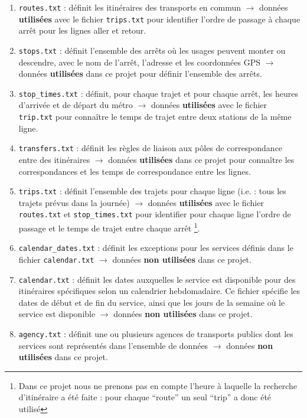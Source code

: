 \documentclass[,french]{article}
\let\rmarkdownfootnote\footnote%
\def\footnote{\protect\rmarkdownfootnote}
\begin{document}
\begin{enumerate}
\def\labelenumi{\arabic{enumi}.}
\item
  \texttt{routes.txt} : définit les itinéraires des transports en commun
  \(\rightarrow\) données \textbf{utilisées} avec le fichier
  \texttt{trips.txt} pour identifier l'ordre de passage à chaque arrêt
  pour les lignes aller et retour.
\item
  \texttt{stops.txt} : définit l'ensemble des arrêts où les usages
  peuvent monter ou descendre, avec le nom de l'arrêt, l'adresse et les
  coordonnées GPS \(\rightarrow\) données \textbf{utilisées} dans ce
  projet pour définir l'ensemble des arrêts.
\item
  \texttt{stop\_times.txt} : définit, pour chaque trajet et pour chaque
  arrêt, les heures d'arrivée et de départ du métro \(\rightarrow\)
  données \textbf{utilisées} avec le fichier \texttt{trip.txt} pour
  connaître le temps de trajet entre deux stations de la même ligne.
\item
  \texttt{transfers.txt} : définit les règles de liaison aux pôles de
  correspondance entre des itinéraires \(\rightarrow\) données
  \textbf{utilisées} dans ce projet pour connaître les correspondances
  et les temps de correspondance entre les lignes.
\item
  \texttt{trips.txt} : définit l'ensemble des trajets pour chaque ligne
  (i.e. : tous les trajets prévus dans la journée) \(\rightarrow\)
  données \textbf{utilisées} avec le fichier \texttt{routes.txt} et
  \texttt{stop\_times.txt} pour identifier pour chaque ligne l'ordre de
  passage et le temps de trajet entre chaque arrêt \footnote{Dans ce
    projet nous ne prenons pas en compte l'heure à laquelle la recherche
    d'itinéraire a été faite : pour chaque ``route'' un seul ``trip'' a
    donc été utilisé}.
\item
  \texttt{calendar\_dates.txt} : définit les exceptions pour les
  services définis dans le fichier \texttt{calendar.txt} \(\rightarrow\)
  données \textbf{non utilisées} dans ce projet.
\item
  \texttt{calendar.txt} : définit les dates auxquelles le service est
  disponible pour des itinéraires spécifiques selon un calendrier
  hebdomadaire. Ce fichier spécifie les dates de début et de fin du
  service, ainsi que les jours de la semaine où le service est
  disponible \(\rightarrow\) données \textbf{non utilisées} dans ce
  projet.
\item
  \texttt{agency.txt} : définit une ou plusieurs agences de transports
  publics dont les services sont représentés dans l'ensemble de données
  \(\rightarrow\) données \textbf{non utilisées} dans ce projet.
\end{enumerate}
\end{document}
